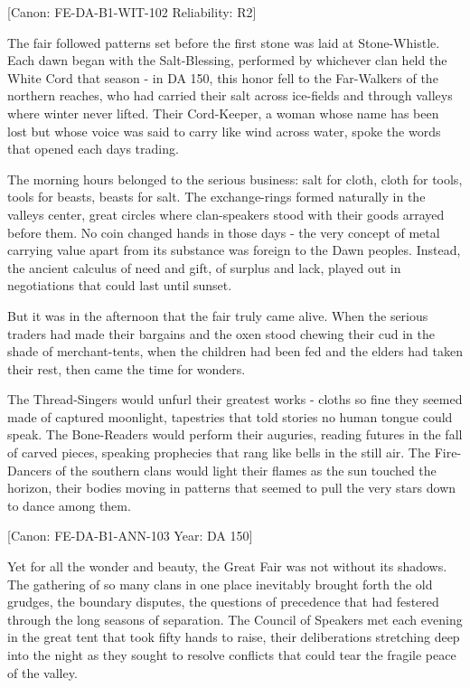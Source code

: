 {[}Canon: FE-DA-B1-WIT-102 \textbar{} Reliability: R2{]}

The fair followed patterns set before the first stone was laid at
Stone-Whistle. Each dawn began with the Salt-Blessing, performed by
whichever clan held the White Cord that season - in DA 150, this honor
fell to the Far-Walkers of the northern reaches, who had carried their
salt across ice-fields and through valleys where winter never lifted.
Their Cord-Keeper, a woman whose name has been lost but whose voice was
said to carry like wind across water, spoke the words that opened each
day\textquotesingle s trading.

The morning hours belonged to the serious business: salt for cloth,
cloth for tools, tools for beasts, beasts for salt. The exchange-rings
formed naturally in the valley\textquotesingle s center, great circles
where clan-speakers stood with their goods arrayed before them. No coin
changed hands in those days - the very concept of metal carrying value
apart from its substance was foreign to the Dawn peoples. Instead, the
ancient calculus of need and gift, of surplus and lack, played out in
negotiations that could last until sunset.

But it was in the afternoon that the fair truly came alive. When the
serious traders had made their bargains and the oxen stood chewing their
cud in the shade of merchant-tents, when the children had been fed and
the elders had taken their rest, then came the time for wonders.

The Thread-Singers would unfurl their greatest works - cloths so fine
they seemed made of captured moonlight, tapestries that told stories no
human tongue could speak. The Bone-Readers would perform their auguries,
reading futures in the fall of carved pieces, speaking prophecies that
rang like bells in the still air. The Fire-Dancers of the southern clans
would light their flames as the sun touched the horizon, their bodies
moving in patterns that seemed to pull the very stars down to dance
among them.

{[}Canon: FE-DA-B1-ANN-103 \textbar{} Year: DA 150{]}

Yet for all the wonder and beauty, the Great Fair was not without its
shadows. The gathering of so many clans in one place inevitably brought
forth the old grudges, the boundary disputes, the questions of
precedence that had festered through the long seasons of separation. The
Council of Speakers met each evening in the great tent that took fifty
hands to raise, their deliberations stretching deep into the night as
they sought to resolve conflicts that could tear the fragile peace of
the valley.

